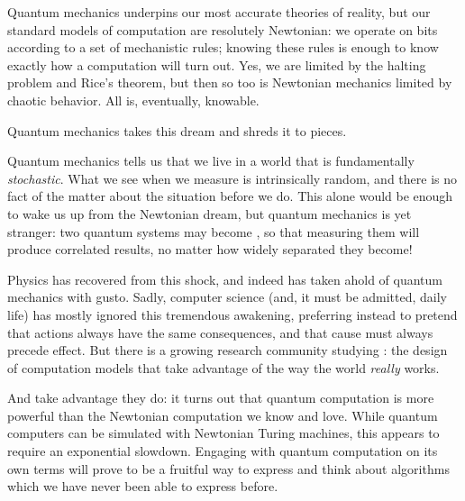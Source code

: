 Quantum mechanics underpins our most accurate theories of
reality,\footnotemark{} but our standard models of computation are resolutely
Newtonian: we operate on bits according to a set of mechanistic rules; knowing
these rules is enough to know exactly how a computation will turn out.  Yes, we
are limited by the halting problem and Rice's theorem, but then so too is
Newtonian mechanics limited by chaotic behavior.  All is, eventually, knowable.


Quantum mechanics takes this dream and shreds it to pieces.

Quantum mechanics tells us that we live in a world that is fundamentally
\emph{stochastic}.  What we see when we measure is intrinsically random, and
there is no fact of the matter about the situation before we do.\footnotemark{}
This alone would be enough to wake us up from the Newtonian dream, but quantum
mechanics is yet stranger: two quantum systems may become , so
that measuring them will produce correlated results, no matter how widely
separated they become!


Physics has recovered from this shock, and indeed has taken ahold of quantum
mechanics with gusto.  Sadly, computer science (and, it must be admitted, daily
life) has mostly ignored this tremendous awakening, preferring instead to
pretend that actions always have the same consequences, and that cause must
always precede effect.  But there is a growing research community studying
: the design of computation models that take advantage
of the way the world \emph{really} works.  

And take advantage they do: it turns out that quantum computation is more
powerful than the Newtonian computation we know and love.  While quantum
computers can be simulated with Newtonian Turing machines, this appears to
require an exponential slowdown.  \citeme{}  Engaging with quantum computation
on its own terms will prove to be a fruitful way to express and think about
algorithms which we have never been able to express before.

